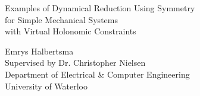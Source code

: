 \begin{titlepage}
\begin{center}
    \vspace*{90mm}
    \hline
    \vspace{4mm}
    \huge{ 
        {
            {Examples of Dynamical Reduction Using Symmetry\\for Simple Mechanical Systems \\with Virtual Holonomic Constraints}
        }
    }
    \vspace{6mm}
    \hline
    \vspace*{10mm}
\end{center}

\vspace*{25mm}

\begin{center}
    {
        \Large{
            {Emrys Halbertsma}
        }
        \vspace{4mm}\\
	\Large{
	    Supervised by Dr. Christopher Nielsen\\Department of Electrical \& Computer Engineering\\University of Waterloo}
    }
\end{center}

\pagebreak

\end{titlepage}
